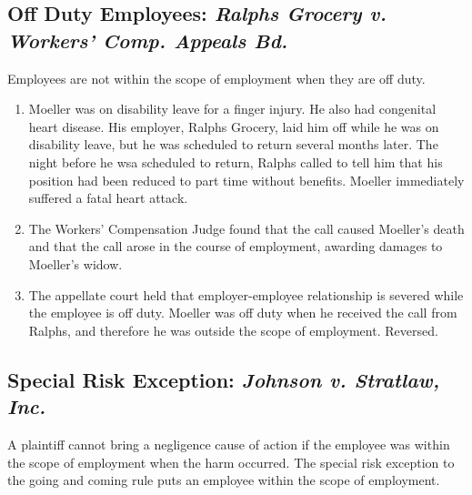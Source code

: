 \subsection{Off Duty Employees: \emph{Ralphs Grocery v. Workers' Comp. Appeals Bd.}}

Employees are not within the scope of employment when they are off duty.

\begin{enumerate}
    \item Moeller was on disability leave for a finger injury. He also had 
    congenital heart disease. His employer, Ralphs Grocery, laid him off while 
    he was on disability leave, but he was scheduled to return several months 
    later. The night before he wsa scheduled to return, Ralphs called to tell 
    him that his position had been reduced to part time without benefits. 
    Moeller immediately suffered a fatal heart attack.
    \item The Workers' Compensation Judge found that the call caused Moeller's death 
    and that the call arose in the course of employment, awarding damages to 
    Moeller's widow.
    \item The appellate court held that employer-employee relationship is 
    severed while the employee is off duty. Moeller was off duty when he 
    received the call from Ralphs, and therefore he was outside the scope of 
    employment. Reversed.
\end{enumerate}

\subsection{Special Risk Exception: \emph{Johnson v. Stratlaw, Inc.}}

A plaintiff cannot bring a negligence cause of action if the employee was 
within the scope of employment when the harm occurred. The special risk 
exception to the going and coming rule puts an employee within the scope of 
employment.

